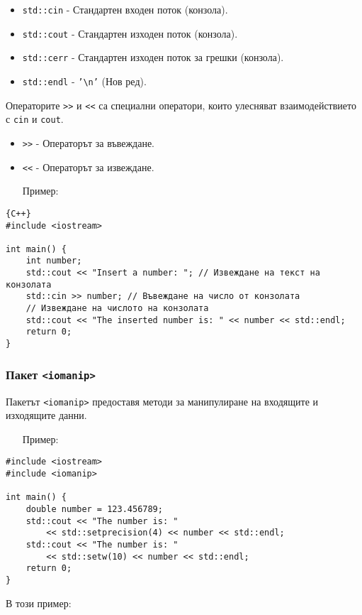 \documentclass[oneside]{book}
\newcommand*{\code}[1]{\texttt{#1}}
\newcommand*{\bs}{\textbackslash}
\begin{document}
\begin{itemize}
    \item \code{std::cin} - Стандартен входен поток (конзола).
    \item \code{std::cout} - Стандартен изходен поток (конзола).
    \item \code{std::cerr} - Стандартен изходен поток за грешки (конзола).
    \item \code{std::endl} - \code{'\bs n'} (Нов ред).
\end{itemize}

Операторите \code{>}\code{>} и \code{<}\code{<} са специални оператори, които улесняват взаимодействието с \code{cin} и \code{cout}.

\begin{itemize}
    \item \code{>}\code{>} - Операторът за въвеждане.
    \item \code{<}\code{<} - Операторът за извеждане.
\end{itemize}
\pagebreak
\begin{itemize}\item[Пример:]\end{itemize} 
\begin{mdframed}\begin{lstlisting}{C++}
#include <iostream>

int main() {
    int number;
    std::cout << "Insert a number: "; // Извеждане на текст на конзолата
    std::cin >> number; // Въвеждане на число от конзолата
    // Извеждане на числото на конзолата
    std::cout << "The inserted number is: " << number << std::endl;
    return 0;
}
\end{lstlisting}\end{mdframed}

\subsubsection{Пакет \code{<iomanip>}}
Пакетът \code{<iomanip>} предоставя методи за манипулиране на входящите и изходящите данни.

\begin{itemize}\item[Пример:]\end{itemize} 
\begin{mdframed}\begin{lstlisting}
#include <iostream>
#include <iomanip>

int main() {
    double number = 123.456789;
    std::cout << "The number is: " 
        << std::setprecision(4) << number << std::endl;
    std::cout << "The number is: " 
        << std::setw(10) << number << std::endl;
    return 0;
}
\end{lstlisting}\end{mdframed}
В този пример:
\end{document}

